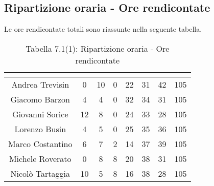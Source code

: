 \subsection{Ripartizione oraria - Ore rendicontate}
Le ore rendicontate totali sono riassunte nella seguente tabella.
\renewcommand{\arraystretch}{1.5}
\begin{table}[H]
\begin{center}
\begin{tabular}{|c|c|c|c|c|c|c|c|}
\hline
\rowcolor{title_row}
\textbf{\color{title_text}{Nome}} & \textbf{\color{title_text}{Resp.}} & \textbf{\color{title_text}{Ammi.}} & \textbf{\color{title_text}{Analist.}} & \textbf{\color{title_text}{Progett.}} & \textbf{\color{title_text}{Program.}} & \textbf{\color{title_text}{Verific.}} & \textbf{\color{title_text}{Totale}} \\ \hline
Andrea Trevisin  & 0 & 10 & 0 & 22 & 31 & 42 & 105  \\ \hline
Giacomo Barzon   & 4 & 4 & 0 & 32 & 34 & 31 & 105  \\ \hline
Giovanni Sorice  & 12 & 8 & 0 & 24 & 33 & 28 & 105 \\ \hline
Lorenzo Busin    & 4 & 5 & 0 & 25 & 35 & 36 & 105 \\ \hline
Marco Costantino & 6 & 7 & 2 & 14 & 37 & 39 & 105 \\ \hline
Michele Roverato & 0 & 8 & 8 & 20 & 38 & 31 & 105 \\ \hline
Nicolò Tartaggia & 10 & 5 & 8 & 16 & 38 & 28 & 105 \\ \hline
\end{tabular}
\caption{Tabella 7.1(1): Ripartizione oraria - Ore rendicontate\label{}}
\end{center}
\end{table}
\renewcommand{\arraystretch}{1}

